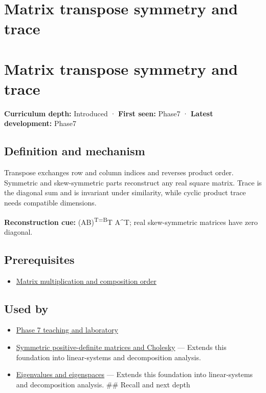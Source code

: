 \hypertarget{appendix-175ca5ff874d}{}
\section*{Matrix transpose symmetry and trace}
\section{Matrix transpose symmetry and trace}\label{matrix-transpose-symmetry-and-trace}

\textbf{Curriculum depth:} Introduced · \textbf{First seen:} Phase7 · \textbf{Latest development:} Phase7

\subsection{Definition and mechanism}\label{definition-and-mechanism}

Transpose exchanges row and column indices and reverses product order. Symmetric and skew-symmetric parts reconstruct any real square matrix. Trace is the diagonal sum and is invariant under similarity, while cyclic product trace needs compatible dimensions.

\textbf{Reconstruction cue:} (AB)\textsuperscript{T=B}T A\^{}T; real skew-symmetric matrices have zero diagonal.

\subsection{Prerequisites}\label{prerequisites}

\begin{itemize}
\tightlist
\item
  \hyperref[appendix-ab31ef447dbf]{Matrix multiplication and composition order}
\end{itemize}

\subsection{Used by}\label{used-by}

\begin{itemize}
\tightlist
\item
  \href{Continuous\%20Notes/Computing\%20Foundations\%20-\%20From\%20Bits\%20to\%20C++\%20and\%20Systems\%20APIs\#Keep\%20the\%20promises\%20visible\%20while\%20moving\%20between\%20representations}{Phase 7 teaching and laboratory}
\item
  \hyperref[appendix-50d2ea3c9b26]{Symmetric positive-definite matrices and Cholesky} --- Extends this foundation into linear-systems and decomposition analysis.
\item
  \hyperref[appendix-0b3be18411f9]{Eigenvalues and eigenspaces} --- Extends this foundation into linear-systems and decomposition analysis. \#\# Recall and next depth
\end{itemize}

